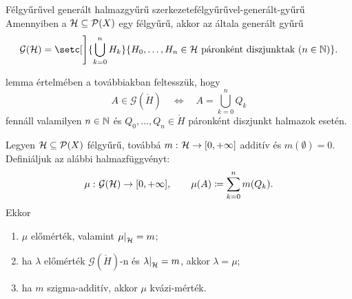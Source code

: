 \documentclass[
]{elteikthesis}[2024/04/26]
\begin{document}
	\begin{lemma}{Félgyűrűvel generált halmazgyűrű szerkezete}{félgyűrűvel-generált-gyűrű}
		Amennyiben a \( \mathcal{H} \subseteq \mathcal{P}( X ) \) egy félgyűrű, 
		akkor az általa generált gyűrű
		\[
			\mathcal{G}(\ring{H}) = 
			\setc[\Bigg]{ \bigcup_{k=0}^n H_k }
			            { H_0, \dots, H_n \in \ring{H} \text{ páronként diszjunktak} \ (n \in \N)}.
		\]
	\end{lemma}
	
	\noindent
	 lemma értelmében a továbbiakban feltesszük, hogy
	\[
		A \in \mathcal{G}(\ring{H})
		\quad \iff \quad
		A = \bigcup_{k=0}^{n} Q_k
	\]
	fennáll valamilyen \( n \in \mathbb{N} \) és \( Q_0, \dots, Q_n \in \ring{H} \) páronként diszjunkt halmazok esetén.
		
	\newpage
	\begin{theorem}{}{}		
		Legyen \( \mathcal{H} \subseteq \mathcal{P}( X ) \) félgyűrű, 
		továbbá \( m \,\colon \mathcal{H} \to [0, +\infty] \) additív és \( m(\emptyset) = 0 \).\\[6pt]
		Definiáljuk az alábbi halmazfüggvényt:
		\[
			\mu \,\colon \mathcal{G}(\mathcal{H}) \to [0, +\infty], \qquad
			\mu(A) \coloneq \sum_{k=0}^{n} m( Q_k ).
		\]
		Ekkor
		\begin{enumerate}
			\item \( \mu \) előmérték, valamint \( \restr{\mu}{\ring{H}} = m \);
			
			\item ha \( \lambda \) előmérték \( \mathcal{G}(\ring{H}) \)-n
			és \( \restr{\lambda}{\ring{H}} = m \), akkor \( \lambda = \mu \);
			
			\item ha \( m \) szigma-additív, akkor \( \mu \) kvázi-mérték.
		\end{enumerate}
	\end{theorem}
\end{document}
